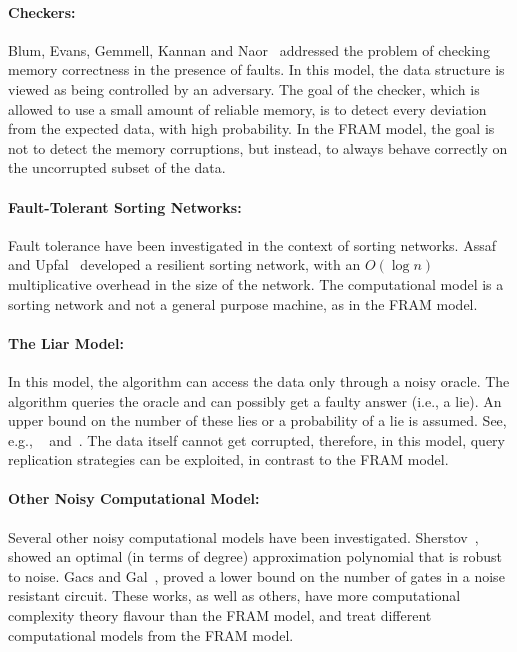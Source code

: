 \documentclass{llncs}
\begin{document}
\paragraph{Checkers:}

		Blum, Evans, Gemmell, Kannan and Naor~\cite{checkers} 
		addressed the problem of checking memory correctness in the presence of faults.
		In this model, the data structure is viewed as being controlled by an adversary.
		The goal of the checker,
		which is allowed to use a small amount of reliable memory,
		is to detect every deviation from the expected data, 
		with high probability. In the FRAM model, the goal is not to detect the 
		memory corruptions, but instead, to always behave correctly on the uncorrupted subset of the data.

\paragraph{Fault-Tolerant Sorting Networks:}
		
		Fault tolerance have been investigated in the context of sorting networks.
		Assaf and Upfal~\cite{fault_tolerant_sorting_networks} developed a resilient sorting network,
		with an $O(\log n)$ multiplicative overhead in the size of the network.
		The computational model is a sorting network and not a general purpose machine, as in the FRAM model.
				 
\paragraph{The Liar Model:} 

		In this model, the algorithm can access the data only through a noisy oracle.
		The algorithm queries the oracle and can possibly get a faulty answer (i.e., a lie).
		An upper bound on the number of these lies or a probability of a lie is assumed.
		See, e.g., ~\cite{liar_1} and~\cite{liar_2}.
		The data itself cannot get corrupted, therefore, 
		in this model, query replication strategies can be exploited,
		in contrast to the FRAM model.

\paragraph{Other Noisy Computational Model:}
		
		Several other noisy computational models have been investigated.
		Sherstov~\cite{robust_polynomials}, showed an optimal (in terms of degree) approximation polynomial
		that is robust to noise. Gacs and Gal~\cite{robust_circuits}, proved a lower bound on the number of gates
		in a noise resistant circuit.
		These works, as well as others, have more computational complexity theory flavour than the FRAM model,
		and treat different computational models from the FRAM model.
\end{document}
